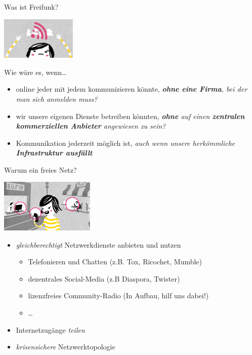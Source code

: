 \documentclass[10pt]{beamer}
\begin{document}
  \begin{frame}{Was ist Freifunk?}
      \begin{center}
        \includegraphics[width=3.6cm]{images/up}
      \end{center}
      Wie wäre es, wenn\ldots
      \begin{itemize}
        \pause
        \item online jeder mit jedem kommunizieren könnte\pause, \textit{\textbf{ohne eine Firma}, bei der man sich anmelden muss?}
        \pause
        \item wir unsere eigenen Dienste betreiben könnten\pause,  \textit{\textbf{ohne} auf einen \textbf{zentralen kommerziellen Anbieter} angewiesen zu sein?}
        \pause
        \item Kommunikation jederzeit möglich ist\pause, \textit{auch wenn unsere herkömmliche \textbf{Infrastruktur ausfällt}}
      \end{itemize}
    \end{frame}
    
    \begin{frame}{Warum ein freies Netz?}

      \begin{center}
        \includegraphics[width=4.5cm]{images/verbindet}
      \end{center}

      \begin{itemize}
        \item \emph{gleichberechtigt} Netzwerkdienste anbieten und nutzen
        \begin{itemize}
          \item Telefonieren und Chatten (z.B. Tox, Ricochet, Mumble)
          \item dezentrales Social-Media (z.B Diaspora, Twister)
          \item lizenzfreies Community-Radio (In Aufbau, hilf uns dabei!)
          \item \ldots
        \end{itemize}
        \item Internetzugänge \emph{teilen}
        \item \emph{krisensichere} Netzwerktopologie
      \end{itemize}
      \vfill
    \end{frame}
  
\end{document}
